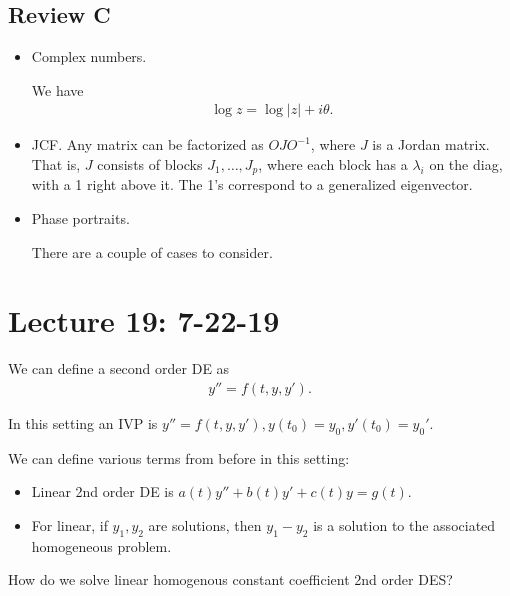 \documentclass{article}
\begin{document}
\subsection{Review C}

\begin{itemize}
  \item Complex numbers.

    We have
    \begin{align*}
      \log z = \log |z| + i \theta.
    \end{align*}

  \item JCF.  Any matrix can be factorized as $O J O^{-1}$, where $J$ is a Jordan matrix.  That is, $J$ consists of blocks $J_1, \dots, J_p$, where each block has a $\lambda_i$ on the diag, with a 1 right above it.  The 1's correspond to a generalized eigenvector.

  \item Phase portraits.

    There are a couple of cases to consider.


\end{itemize}


\section{Lecture 19: 7-22-19}

We can define a second order DE as
\begin{align*}
  y'' = f(t, y, y').
\end{align*}

In this setting an IVP is $y'' = f(t, y, y'), y(t_0) = y_0, y'(t_0) = y_0'$.

We can define various terms from before in this setting:

\begin{itemize}
  \item Linear 2nd order DE is $a(t) y'' + b(t) y' + c(t) y = g(t)$.
  \item For linear, if $y_1, y_2$ are solutions, then $y_1 - y_2$ is a solution to the associated homogeneous problem.
\end{itemize}

How do we solve linear homogenous constant coefficient 2nd order DES?
\end{document}
